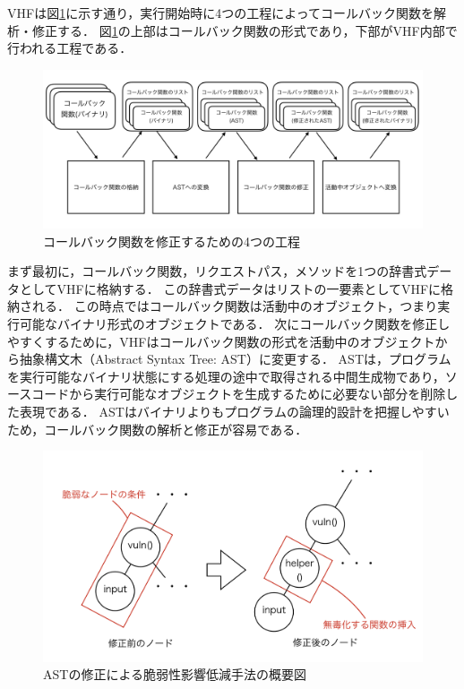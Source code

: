 \documentclass[a4paper,12pt]{jreport}
\begin{document}
VHFは図\ref{fig:4steps}に示す通り，実行開始時に4つの工程によってコールバック関数を解析・修正する．
図\ref{fig:4steps}の上部はコールバック関数の形式であり，下部がVHF内部で行われる工程である．
\begin{figure}[ht]
 \begin{center}
  \includegraphics[clip, width=130mm]{./figures/4steps.png}
  \caption{コールバック関数を修正するための4つの工程}
  \label{fig:4steps}
 \end{center}
\end{figure}
まず最初に，コールバック関数，リクエストパス，メソッドを1つの辞書式データとしてVHFに格納する．
この辞書式データはリストの一要素としてVHFに格納される．
この時点ではコールバック関数は活動中のオブジェクト，つまり実行可能なバイナリ形式のオブジェクトである．
次にコールバック関数を修正しやすくするために，VHFはコールバック関数の形式を活動中のオブジェクトから抽象構文木\cite{ref:ast}（Abstract Syntax Tree: AST）に変更する．
ASTは，プログラムを実行可能なバイナリ状態にする処理の途中で取得される中間生成物であり，ソースコードから実行可能なオブジェクトを生成するために必要ない部分を削除した表現である．
ASTはバイナリよりもプログラムの論理的設計を把握しやすいため，コールバック関数の解析と修正が容易である．
\begin{figure}[t]
 \begin{center}
  \includegraphics[clip, width=130mm]{./figures/modifying_ast.png}
  \caption{ASTの修正による脆弱性影響低減手法の概要図}
  \label{fig:modifying_ast}
 \end{center}
\end{figure}
\end{document}
